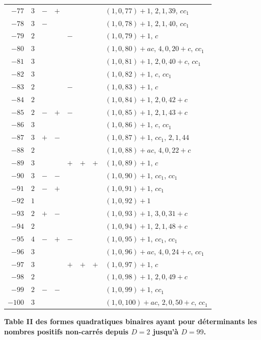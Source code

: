 \documentclass[11pt,a4paper]{article}
\begin{document}
\begin{longtable}{r|r|ccccc|>{\raggedright\arraybackslash}p{4.5cm}}
$-77$ & $3$ & $-$ & $+$ & & & & $(1,0,77)+1$, $2,1,39$, $cc_1$ \\
$-78$ & $3$ & $-$ & & & & & $(1,0,78)+1$, $2,1,40$, $cc_1$ \\
$-79$ & $2$ & & & $-$ & & & $(1,0,79)+1$, $c$ \\
$-80$ & $3$ & & & & & & $(1,0,80)+ac$, $4,0,20+c$, $cc_1$ \\
$-81$ & $3$ & & & & & & $(1,0,81)+1$, $2,0,40+c$, $cc_1$ \\
$-82$ & $3$ & & & & & & $(1,0,82)+1$, $c$, $cc_1$ \\
$-83$ & $2$ & & & $-$ & & & $(1,0,83)+1$, $c$ \\
$-84$ & $2$ & & & & & & $(1,0,84)+1$, $2,0,42+c$ \\
$-85$ & $2$ & $-$ & $+$ & $-$ & & & $(1,0,85)+1$, $2,1,43+c$ \\
$-86$ & $3$ & & & & & & $(1,0,86)+1$, $c$, $cc_1$ \\
$-87$ & $3$ & $+$ & $-$ & & & & $(1,0,87)+1$, $cc_1$, $2,1,44$ \\
$-88$ & $2$ & & & & & & $(1,0,88)+ac$, $4,0,22+c$ \\
$-89$ & $3$ & & & $+$ & $+$ & $+$ & $(1,0,89)+1$, $c$ \\
$-90$ & $3$ & $-$ & $-$ & & & & $(1,0,90)+1$, $cc_1$, $cc_1$ \\
$-91$ & $2$ & $-$ & $+$ & & & & $(1,0,91)+1$, $cc_1$ \\
$-92$ & $1$ & & & & & & $(1,0,92)+1$ \\
$-93$ & $2$ & $+$ & $-$ & & & & $(1,0,93)+1$, $3,0,31+c$ \\
$-94$ & $2$ & & & & & & $(1,0,94)+1$, $2,1,48+c$ \\
$-95$ & $4$ & $-$ & $+$ & $-$ & & & $(1,0,95)+1$, $cc_1$, $cc_1$ \\
$-96$ & $3$ & & & & & & $(1,0,96)+ac$, $4,0,24+c$, $cc_1$ \\
$-97$ & $3$ & & & $+$ & $+$ & $+$ & $(1,0,97)+1$, $c$ \\
$-98$ & $2$ & & & & & & $(1,0,98)+1$, $2,0,49+c$ \\
$-99$ & $2$ & $-$ & $-$ & & & & $(1,0,99)+1$, $cc_1$ \\
$-100$ & $3$ & & & & & & $(1,0,100)+ac$, $2,0,50+c$, $cc_1$ \\
\end{longtable}

\newpage
\noindent\textbf{Table II des formes quadratiques binaires ayant pour d\'{e}terminants les nombres positifs non-carr\'{e}s depuis $D=2$ jusqu'\`{a} $D=99$.}
\end{document}
